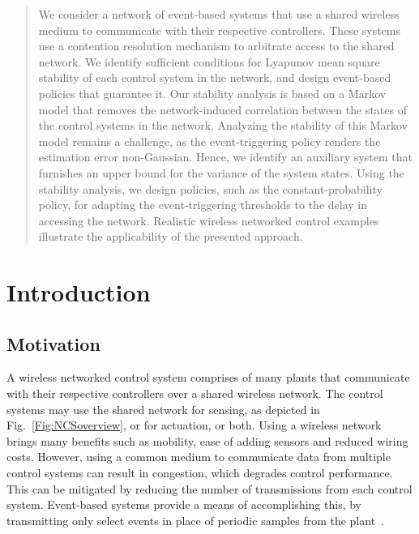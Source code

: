 \documentclass[twocolumn]{autart}
\begin{document}
\begin{abstract}
We consider a network of event-based systems that use a shared wireless medium to communicate with their respective controllers. These systems use a contention resolution mechanism to arbitrate access to the shared network. We identify sufficient conditions for Lyapunov mean square stability of each control system in the network, and design event-based policies that guarantee it. Our stability analysis is based on a Markov model that removes the network-induced correlation between the states of the control systems in the network. Analyzing the stability of this Markov model remains a challenge, as the event-triggering policy renders the estimation error non-Gaussian. Hence, we identify an auxiliary system that furnishes an upper bound for the variance of the system states. Using the stability analysis, we design policies, such as the constant-probability policy, for adapting the event-triggering thresholds to the delay in accessing the network. Realistic wireless networked control examples illustrate the applicability of the presented approach.
\end{abstract}

\section{Introduction} \label{S:Intro}

\subsection{Motivation}
A wireless networked control system comprises of many plants that communicate with their respective controllers over a shared wireless network. The control systems may use the shared network for sensing, as depicted in Fig.~\ref{Fig:NCSoverview}, or for actuation, or both. Using a wireless network brings many benefits such as mobility, ease of adding sensors and reduced wiring costs. However, using a common medium to communicate data from multiple control systems can result in congestion, which degrades control performance. This can be mitigated by reducing the number of transmissions from each control system. Event-based systems provide a means of accomplishing this, by transmitting only select events in place of periodic samples from the plant~\cite{Otanez2002,Astrom2002}.
\end{document}
